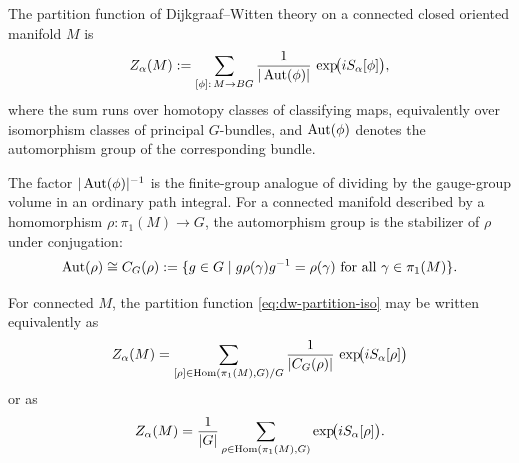\begin{definition}\label{def:dw-partition}
The partition function of Dijkgraaf--Witten theory on a connected closed oriented manifold $M$ is
\begin{equation}\label{eq:dw-partition-iso}
Z_\alpha(M)
:=
\sum_{[\phi]:\,M\to BG}
\frac{1}{|\operatorname{Aut}(\phi)|}\,
\exp\!\bigl(iS_\alpha[\phi]\bigr),
\end{equation}
where the sum runs over homotopy classes of classifying maps, equivalently over isomorphism classes of principal $G$-bundles, and $\operatorname{Aut}(\phi)$ denotes the automorphism group of the corresponding bundle.
\end{definition}

\noindent The factor $|\operatorname{Aut}(\phi)|^{-1}$ is the finite-group analogue of dividing by the gauge-group volume in an ordinary path integral. For a connected manifold described by a homomorphism $\rho:\pi_1(M)\to G$, the automorphism group is the stabilizer of $\rho$ under conjugation:
\begin{equation}\label{eq:dw-aut-centralizer}
\operatorname{Aut}(\rho)\cong C_G(\rho):=\{g\in G\mid g\rho(\gamma)g^{-1}=\rho(\gamma)\text{ for all }\gamma\in\pi_1(M)\}.
\end{equation}

\begin{proposition}\label{prop:dw-equivalent-sums}
For connected $M$, the partition function \eqref{eq:dw-partition-iso} may be written equivalently as
\begin{equation}\label{eq:dw-partition-conj}
Z_\alpha(M)
=
\sum_{[\rho]\in \operatorname{Hom}(\pi_1(M),G)/G}
\frac{1}{|C_G(\rho)|}\,
\exp\!\bigl(iS_\alpha[\rho]\bigr)
\end{equation}
or as
\begin{equation}\label{eq:dw-partition-allhom}
Z_\alpha(M)
=
\frac{1}{|G|}
\sum_{\rho\in \operatorname{Hom}(\pi_1(M),G)}
\exp\!\bigl(iS_\alpha[\rho]\bigr).
\end{equation}
\end{proposition}

